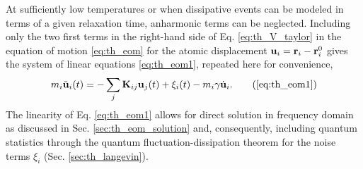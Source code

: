 
At sufficiently low temperatures or when dissipative events can be modeled in terms of a given relaxation time, anharmonic terms can be neglected. Including only the two first terms in the right-hand side of Eq. \eqref{eq:th_V_taylor} in the equation of motion \eqref{eq:th_eom} for the atomic displacement $\mathbf{u}_i=\mathbf{r}_i-\mathbf{r}_i^0$ gives the system of linear equations \eqref{eq:th_eom1}, repeated here for convenience,
\begin{equation}
 m_i \ddot{\bu}_i(t) =  - \sum_j \bb{K}_{ij}\bb{u}_j(t) + \xi_i(t) - m_i \gamma \dot{\bu}_i.  \tag{\ref{eq:th_eom1}}
\end{equation}
The linearity of Eq. \eqref{eq:th_eom1} allows for direct solution in frequency domain as discussed in Sec. \ref{sec:th_eom_solution} and, consequently, including quantum statistics through the quantum fluctuation-dissipation theorem for the noise terms $\xi_i$ (Sec. \ref{sec:th_langevin}). 



